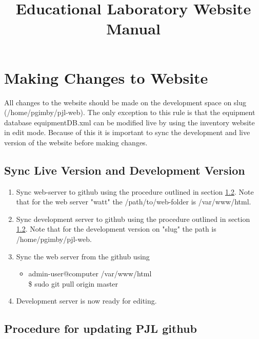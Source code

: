 \documentclass[justified]{article}
\begin{document}
\title{Educational Laboratory Website Manual}
\maketitle
\tableofcontents

\section{Making Changes to Website}

All changes to the website should be made on the development space on slug (/home/pgimby/pjl-web). The only exception to this rule is that the equipment database equipmentDB.xml can be modified live by using the inventory website in edit mode. Because of this it is important to sync the development and live version of the website before making changes.

\subsection{Sync Live Version and Development Version}

\begin{enumerate}
\item Sync web-server to github using the procedure outlined in section \ref{proc:sync}. Note that for the web server "watt" the /path/to/web-folder is /var/www/html.

\item Sync development server to github using the procedure outlined in section \ref{proc:sync}. Note that for the development version on "slug" the path is /home/pgimby/pjl-web.

\item Sync the web server from the github using
\begin{itemize}
	\item admin-user@computer /var/www/html\\
	\$ sudo git pull origin master
\end{itemize}

\item Development server is now ready for editing.
\end{enumerate}


\subsection{Procedure for updating PJL github}\label{proc:sync}
\end{document}
